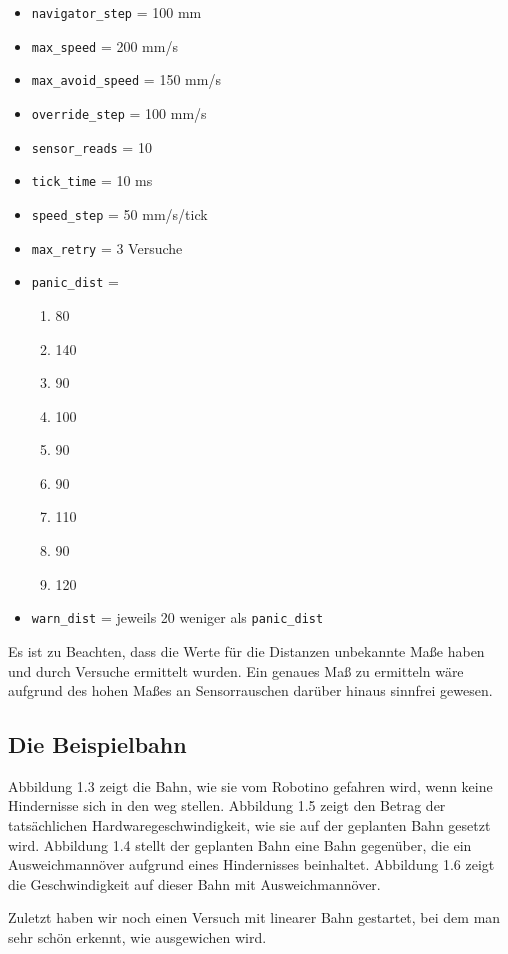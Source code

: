 \begin{itemize}
	\item \verb|navigator_step|	= 100 mm
	\item \verb|max_speed|			= 200 mm/s
	\item \verb|max_avoid_speed|	= 150 mm/s
	\item \verb|override_step|		= 100 mm/s
	\item \verb|sensor_reads|		= 10
	\item \verb|tick_time|			= 10 ms
	\item \verb|speed_step|			= 50 mm/s/tick
	\item \verb|max_retry|			= 3 Versuche
	\item \verb|panic_dist|			=
	\begin{enumerate}
		\item 80
		\item 140
		\item 90
		\item 100
		\item 90
		\item 90
		\item 110
		\item 90
		\item 120
	\end{enumerate}
	\item \verb|warn_dist|			= jeweils 20 weniger als \verb|panic_dist|
\end{itemize}

Es ist zu Beachten, dass die Werte für die Distanzen unbekannte Maße haben und
durch Versuche ermittelt wurden. Ein genaues Maß zu ermitteln wäre aufgrund des
hohen Maßes an Sensorrauschen darüber hinaus sinnfrei gewesen.


\subsection{Die Beispielbahn}

Abbildung 1.3 zeigt die Bahn, wie sie vom Robotino gefahren wird, wenn keine
Hindernisse sich in den weg stellen. Abbildung 1.5 zeigt den Betrag der
tatsächlichen Hardwaregeschwindigkeit, wie sie auf der geplanten Bahn gesetzt
wird. Abbildung 1.4 stellt der geplanten Bahn eine Bahn gegenüber, die ein
Ausweichmannöver aufgrund eines Hindernisses beinhaltet. Abbildung 1.6 zeigt
die Geschwindigkeit auf dieser Bahn mit Ausweichmannöver.

Zuletzt haben wir noch einen Versuch mit linearer Bahn gestartet, bei dem man
sehr schön erkennt, wie ausgewichen wird.




